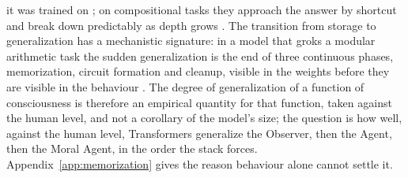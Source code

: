 it was trained on \citep{nogueira2021}; on compositional tasks they approach the answer by shortcut
and break down predictably as depth grows \citep{dziri2023}. The transition from storage to
generalization has a mechanistic signature: in a model that groks a modular arithmetic task the
sudden generalization is the end of three continuous phases, memorization, circuit formation and
cleanup, visible in the weights before they are visible in the behaviour \citep{nanda2023}. The degree
of generalization of a function of consciousness is therefore an empirical quantity for that
function, taken against the human level, and not a corollary of the model's size; the question is how
well, against the human level, Transformers generalize the Observer, then the Agent, then the Moral
Agent, in the order the stack forces. Appendix~\ref{app:memorization} gives the reason behaviour alone
cannot settle it.

